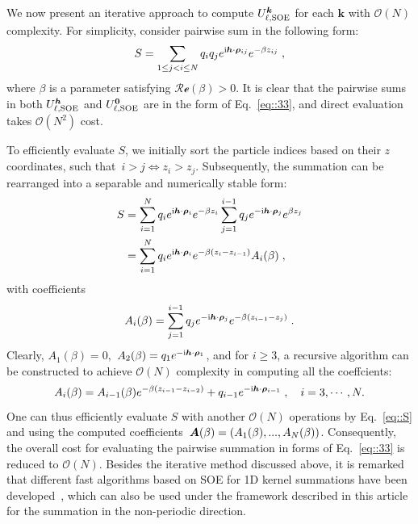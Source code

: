 We now present an iterative approach to compute $U_{\ell,\text{SOE}}^{\boldsymbol{k}}$ for each $\bm{k}$ with $\mathcal O(N)$ complexity. 
For simplicity, consider pairwise sum in the following form:
\begin{equation}\label{eq::33}
	S = \sum_{1\leq j < i \leq N} q_{i} q_{j} e^{\mathrm{i} \boldsymbol{h} \cdot \boldsymbol{\rho}_{ij}} e^{ - \beta z_{ij} }\;,
\end{equation}
where $\beta$ is a parameter satisfying $\mathscr{Re}(\beta)>0$. It is clear that the pairwise sums in both $U_{\ell,\text{SOE}}^{\boldsymbol{h}}$ and $U_{\ell,\text{SOE}}^{\boldsymbol{0}}$ are in the form of Eq.~\eqref{eq::33}, and direct evaluation takes $\mathcal O(N^2)$ cost. 

To efficiently evaluate $S$, we initially sort the particle indices based on their $z$ coordinates, such that~$i > j \iff z_i > z_j$.
Subsequently, the summation can be rearranged into a separable and numerically stable form:
\begin{align}
	S &=\sum_{i = 1}^N q_{i} e^{\mathrm{i} \bm{h}\cdot\bm{\rho}_{i}}e^{-\beta z_{i}} \sum_{j = 1}^{i - 1} q_{j} e^{-\mathrm{i} \bm{h}\cdot\bm{\rho}_{j}}e^{\beta z_{j}} \label{eq::S0} \\ 
	&= \sum_{i = 1}^N q_{i} e^{\mathrm{i} \bm{h}\cdot\bm{\rho}_{i}}e^{-\beta(z_{i} - z_{i - 1})}A_{i}(\beta)\;, \label{eq::S}
\end{align}
with coefficients
\begin{equation}
	A_{i}(\beta) =  \sum_{j = 1}^{i - 1} q_{j} e^{-\mathrm{i} \bm{h}\cdot\bm{\rho}_{j}}e^{-\beta(z_{i - 1} - z_{j})}\;.
\end{equation}
Clearly, $A_1(\beta)=0,$ $A_2(\beta)=q_1e^{-\mathrm{i} \bm{h}\cdot\bm{\rho}_1}$, and for $i\geq 3$, a recursive algorithm can be constructed to achieve $\mathcal O(N)$ complexity in computing all the coeffcients:
\begin{equation}\label{eq::35}
	A_{i}(\beta) = A_{i - 1}(\beta) e^{-\beta(z_{i - 1} - z_{i - 2})} + q_{i - 1}e^{-\mathrm{i} \bm{h}\cdot\bm{\rho}_{i-1}}\;,\quad i = 3, \cdots, N.
\end{equation}
One can thus efficiently evaluate $S$ with another $\mathcal{O}(N)$ operations by Eq.~\eqref{eq::S} and using the computed coefficients~$\boldsymbol{A}(\beta) = (A_1(\beta), ..., A_N(\beta))$. 
Consequently, the overall cost for evaluating the pairwise summation in forms of Eq.~\eqref{eq::33} is reduced to $\mathcal{O}(N)$.
Besides the iterative method discussed above, it is remarked that different fast algorithms based on SOE for 1D kernel summations have been developed~\cite{jiang2021approximating,GIMBUTAS2020815}, which can also be used under the framework described in this article for the summation in the non-periodic direction.


